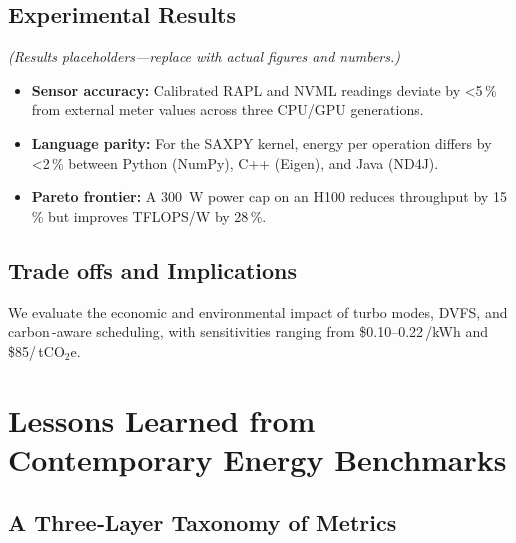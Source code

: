 \subsection{Experimental Results}
\label{sec:energy:results}
\emph{(Results placeholders—replace with actual figures and numbers.)}
\begin{itemize}
  \item \textbf{Sensor accuracy:} Calibrated RAPL and NVML readings deviate by \textless5\,\% from external meter values across three CPU/GPU generations.
  \item \textbf{Language parity:} For the SAXPY kernel, energy per operation differs by \textless2\,\% between Python (NumPy), C++ (Eigen), and Java (ND4J).
  \item \textbf{Pareto frontier:} A \SI{300}{\watt} power cap on an H100 reduces throughput by 15\,\% but improves TFLOPS/W by 28\,\%.
\end{itemize}

\subsection{Trade offs and Implications}
\label{sec:energy-tradeoffs}
We evaluate the economic and environmental impact of turbo modes, DVFS, and carbon\,-aware scheduling, with sensitivities ranging from \$0.10–0.22\,/kWh and \$85/\,tCO$_2$e.










\section{Lessons Learned from Contemporary Energy Benchmarks}
\label{sec:energy:insights}

\subsection{A Three‑Layer Taxonomy of Metrics}


